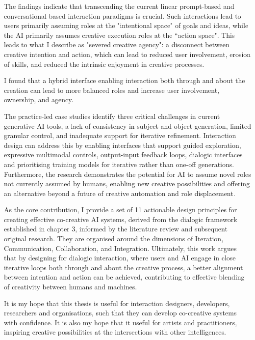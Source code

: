 The findings indicate that transcending the current linear prompt-based and conversational based interaction paradigms is crucial. Such interactions lead to users primarily assuming roles at the "intentional space" of goals and ideas, while the AI primarily assumes creative execution roles at the “action space". This leads to what I describe as "severed creative agency": a disconnect between creative intention and action, which can lead to reduced user involvement, erosion of skills, and reduced the intrinsic enjoyment in creative processes.

I found that a hybrid interface enabling interaction both through and about the creation can lead to more balanced roles and increase user involvement, ownership, and agency.

The practice-led case studies identify three critical challenges in current generative AI tools, a lack of consistency in subject and object generation, limited granular control, and inadequate support for iterative refinement. Interaction design can address this by enabling interfaces that support guided exploration, expressive multimodal controls, output-input feedback loops, dialogic interfaces and prioritising training models for iterative rather than one-off generations. Furthermore, the research demonstrates the potential for AI to assume novel roles not currently assumed by humans, enabling new creative possibilities and offering an alternative beyond a future of creative automation and role displacement.

As the core contribution, I provide a set of 11 actionable design principles for creating effective co-creative AI systems, derived from the dialogic framework established in chapter 3, informed by the literature review and subsequent original research. They are organised around the dimensions of Iteration, Communication, Collaboration, and Integration. Ultimately, this work argues that by designing for dialogic interaction, where users and AI engage in close iterative loops both through and about the creative process, a better alignment between intention and action can be achieved, contributing to effective blending of creativity between humans and machines.

It is my hope that this thesis is useful for interaction designers, developers, researchers and organisations, such that they can develop co-creative systems with confidence. It is also my hope that it useful for artists and practitioners, inspiring creative possibilities at the intersections with other intelligences.